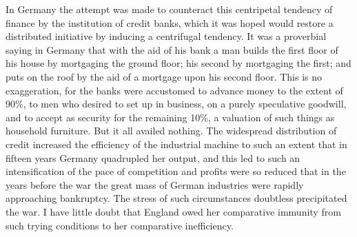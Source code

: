 \documentclass{book}
\begin{document}
In Germany the attempt was made to counteract this centripetal tendency of finance by the institution of credit banks, which it was hoped would restore a distributed initiative by inducing a centrifugal tendency. It was a proverbial saying in Germany that with the aid of his bank a man builds the first floor of his house by mortgaging the ground floor; his second by mortgaging the first; and puts on the roof by the aid of a mortgage upon his second floor. This is no exaggeration, for the banks were accustomed to advance money to the extent of 90\%, to men who desired to set up in business, on a purely speculative goodwill, and to accept as security for the remaining 10\%, a valuation of such things as household furniture. But it all availed nothing. The widespread distribution of credit increased the efficiency of the industrial machine to such an extent that in fifteen years Germany quadrupled her output, and this led to such an intensification of the pace of competition and profits were so reduced that in the years before the war the great mass of German industries were rapidly approaching bankruptcy. The stress of such circumstances doubtless precipitated the war. I have little doubt that England owed her comparative immunity from such trying conditions to her comparative inefficiency.
\end{document}
